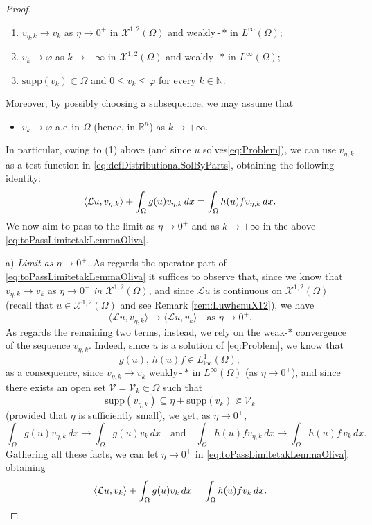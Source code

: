 \documentclass[11pt,a4paper]{amsart}
\def \LL {\mathcal{L}}
\theoremstyle{definition}
\theoremstyle{plain}
\numberwithin{equation}{section}
\begin{document}
{\begin{proof}
\begin{enumerate}
 	\item  $v_{\eta,k}\to v_k$ as $\eta\to 0^+$ in $\mathcal{X}^{1,2}(\Omega)$
 	and weakly\,-\,$*$ in $L^\infty(\Omega)$;
 	\vspace{0.1cm}
 	
 	\item $v_{k}\to \varphi$ as $k\to+\infty$ in $\mathcal{X}^{1,2}(\Omega)$
 	and weakly\,-\,$*$ in $L^\infty(\Omega)$;
 	\vspace{0.1cm}
 	
\item $\mathrm{supp}(v_k)\Subset\Omega$ and $0\leq v_k\leq \varphi$ for every $k\in\mathbb{N}$.
 \end{enumerate}
 Moreover, by possibly choosing a subsequence, we may assume that
 \begin{itemize}
 \item[(5)] $v_k\to \varphi$ a.e.\,in $\Omega$ (hence, in $\mathbb{R}^n$) as $k\to+\infty$.
 \end{itemize}
In particular, owing to (1) above (and  since $u$ solves\eqref{eq:Problem}), we can use  $v_{\eta,k}$ as a test function
in \eqref{eq:defDistributionalSolByParts}, obtaining the following identity:
\begin{equation} \label{eq:toPassLimitetakLemmaOliva}
\langle \LL u,v_{\eta,k}\rangle + \int_{\Omega}g(u)v_{\eta,k} \, dx \\
= \int_{\Omega}h(u)f v_{\eta,k}\, dx.
\end{equation}
We now aim to pass to the limit as $\eta\to 0^+$ and as $k\to+\infty$ in the above \eqref{eq:toPassLimitetakLemmaOliva}.
\medskip

a)\,\,\emph{Limit as $\eta\to 0^+$.}  
As regards the operator part
of \eqref{eq:toPassLimitetakLemmaOliva} it suffices to observe that,  since  we know that $v_{\eta,k}\to v_k$ as $\eta\to 0^+$ \emph{in $\mathcal{X}^{1,2}(\Omega)$}, and since $\mathcal{L}u$ is continuous on $\mathcal{X}^{1,2}(\Omega)$ (recall that $u\in \mathcal{X}^{1,2}(\Omega)$ and see Remark \ref{rem:LuwhenuX12}), we have
$$\langle \mathcal{L}u,v_{\eta,k}\rangle\to \langle \mathcal{L}u,v_{k}\rangle
\quad\text{as $\eta\to 0^+$}.$$
  As regards the remaining two terms, instead, we rely on the weak-$*$ convergence of the sequence $v_{\eta,k}$. Indeed, since $u$ is a solution of \eqref{eq:Problem}, we know that
  $$g(u),\,h(u)f\in L^1_{\mathrm{loc}}(\Omega);$$
as a consequence, since $v_{\eta,k}\to v_k$ weakly\,-\,$*$ in $L^\infty(\Omega)$ (as $\eta\to 0^+$), and since there exists an open set $\mathcal{V} = \mathcal{V}_k\Subset\Omega$ such that
$$\mathrm{supp}(v_{\eta,k})\subseteq\eta+\mathrm{supp}(v_k)\Subset \mathcal{V}_k$$
(provided that $\eta$ is sufficiently small), we get, as $\eta\to 0^+$,
$$\int_{\Omega}g(u)v_{\eta,k} \, dx\to \int_\Omega g(u)v_k\,dx\quad\text{and} 
\quad
\int_{\Omega}h(u)f v_{\eta,k}\, dx\to\int_{\Omega}h(u)f\,v_k\,dx.$$
Gathering all these facts, we can let
$\eta\to 0^+$ in \eqref{eq:toPassLimitetakLemmaOliva}, obtaining
\begin{equation} \label{eq:toPassLimitKOliva}
	\langle \LL u,v_{k}\rangle + \int_{\Omega}g(u)v_{k} \, dx \\
= \int_{\Omega}h(u)f v_{k}\, dx.
\end{equation}


\end{proof}}
\end{document}
